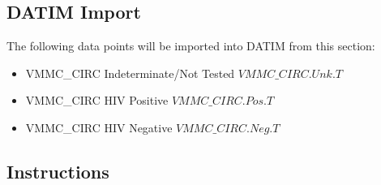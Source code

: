 \documentclass[
  openany]{book}
\begin{document}
\hypertarget{datim-import-29}{%
\subsection{DATIM Import}\label{datim-import-29}}

The following data points will be imported into DATIM from this section:

\begin{itemize}
\item
  VMMC\_CIRC Indeterminate/Not Tested \(VMMC\_CIRC.Unk.T\)
\item
  VMMC\_CIRC HIV Positive \(VMMC\_CIRC.Pos.T\)
\item
  VMMC\_CIRC HIV Negative \(VMMC\_CIRC.Neg.T\)
\end{itemize}

\hypertarget{instructions-29}{%
\subsection{Instructions}\label{instructions-29}}
\end{document}

